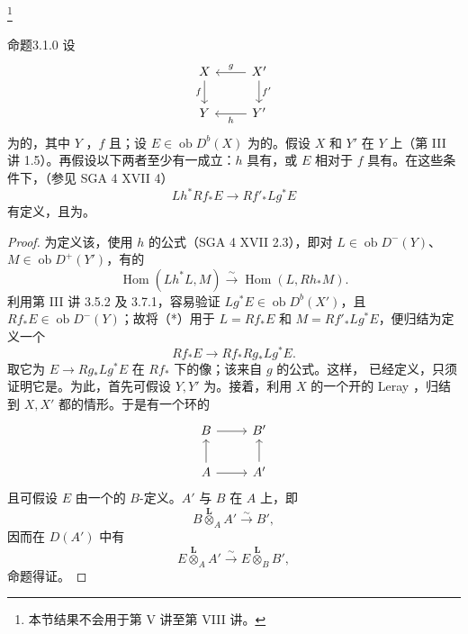 \footnote{本节结果不会用于第 V 讲至第 VIII 讲。}
\begin{SGAresult}{命题}{3.1.0}
设
\[\begin{tikzcd}
X\arrow[d,"f"']&X'\arrow[l,"g"']\arrow[d,"f'"]\\
Y&Y'\arrow[l,"h"]
\end{tikzcd}\]
为的，其中 $Y$ ，$f$ 且；设 $E\in\operatorname{ob}D^b(X)$ 为的。假设 $X$ 和 $Y'$ 在 $Y$ 上（第 III 讲 1.5）。再假设以下两者至少有一成立：$h$ 具有，或 $E$ 相对于 $f$ 具有。在这些条件下，（参见 SGA 4 XVII 4）
\[Lh^*Rf_*E\longrightarrow Rf'_*Lg^*E\]
有定义，且为。
\end{SGAresult}
\begin{proof}
为定义该，使用 $h$ 的公式（SGA 4 XVII 2.3），即对 $L\in\operatorname{ob}D^-(Y)$、$M\in\operatorname{ob}D^+(Y')$，有的
\[\operatorname{Hom}(Lh^*L,M)\xrightarrow{\sim}\operatorname{Hom}(L,Rh_*M).\tag{*}\]
利用第 III 讲 3.5.2 及 3.7.1，容易验证 $Lg^*E\in\operatorname{ob}D^b(X')$，且 $Rf_*E\in\operatorname{ob}D^-(Y)$；故将（*）用于 $L=Rf_*E$ 和 $M=Rf'_*Lg^*E$，便归结为定义一个
\[Rf_*E\longrightarrow Rf_*Rg_*Lg^*E.\]
取它为 $E\to Rg_*Lg^*E$ 在 $Rf_*$ 下的像；该来自 $g$ 的公式。这样，
已经定义，只须证明它是。为此，首先可假设 $Y,Y'$ 为。接着，利用 $X$ 的一个开的 Leray ，归结到 $X,X'$ 都的情形。于是有一个环的
\[\begin{tikzcd}
B\arrow[r]&B'\\
A\arrow[u]\arrow[r]&A'\arrow[u]
\end{tikzcd}\]
且可假设 $E$ 由一个的 $B$-定义。$A'$ 与 $B$ 在 $A$ 上，即
\[B\mathbin{\overset{\mathbf L}{\otimes}}_A A'\xrightarrow{\sim}B',\]
因而在 $D(A')$ 中有
\[E\mathbin{\overset{\mathbf L}{\otimes}}_A A'\xrightarrow{\sim}E\mathbin{\overset{\mathbf L}{\otimes}}_B B',\]
命题得证。
\end{proof}

